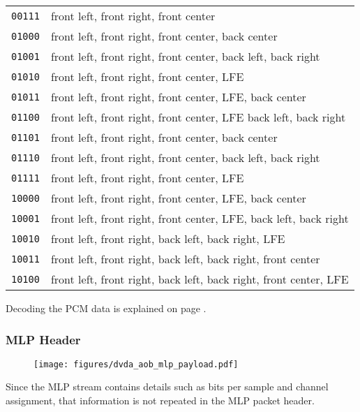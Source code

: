 \begin{table}[h]
{{\begin{tabular}{|c|l|}
\texttt{00111} & front left, front right, front center \\
\texttt{01000} & front left, front right, front center, back center \\
\texttt{01001} & front left, front right, front center, back left, back right \\
\texttt{01010} & front left, front right, front center, LFE\\
\texttt{01011} & front left, front right, front center, LFE, back center \\
\texttt{01100} & front left, front right, front center, LFE back left, back right \\
\texttt{01101} & front left, front right, front center, back center \\
\texttt{01110} & front left, front right, front center, back left, back right \\
\texttt{01111} & front left, front right, front center, LFE \\
\texttt{10000} & front left, front right, front center, LFE, back center \\
\texttt{10001} & front left, front right, front center, LFE, back left, back right \\
\texttt{10010} & front left, front right, back left, back right, LFE \\
\texttt{10011} & front left, front right, back left, back right, front center \\
\texttt{10100} & front left, front right, back left, back right, front center, LFE \\
\hline
\end{tabular}
}
}
\end{table}
\par
\noindent

Decoding the PCM data is explained on page \pageref{aob_pcm}.

\clearpage

\subsubsection{MLP Header}

\begin{figure}[h]
\texttt{[image: figures/dvda\_aob\_mlp\_payload.pdf]}
\end{figure}
\par
\noindent
Since the MLP stream contains details such as bits per sample
and channel assignment, that information is not repeated in the MLP
packet header.

